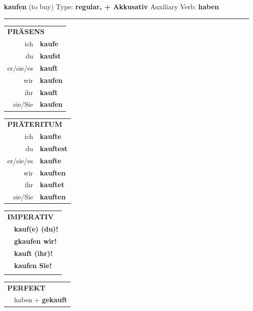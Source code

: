 \documentclass[10pt,a4paper]{revtex4-2}
\begin{document}
\begin{verbbox-acc}
    {\Large \bf kaufen} (to buy) \hfill Type: \textbf{regular, + Akkusativ} \hfill Auxiliary Verb: \textbf{haben} 
    
     \vspace{5pt}

    \hrule
    
    \vspace{5pt}

  \begin{tabular}{rl}
     \multicolumn{2}{l}{\textbf{PRÄSENS} }\\
    ich & \textbf{kaufe}\\
    du & \textbf{kaufst}\\
    er/sie/es & \textbf{kauft}\\
    wir & \textbf{kaufen}\\
    ihr & \textbf{kauft}\\
    sie/Sie & \textbf{kaufen}\\
  \end{tabular}
  \hfill
     \begin{tabular}{rl}
    \multicolumn{2}{l}{\textbf{PRÄTERITUM} }\\
    ich & \textbf{kaufte}\\
    du & \textbf{kauftest}\\
    er/sie/es & \textbf{kaufte}\\
    wir & \textbf{kauften}\\
    ihr & \textbf{kauftet}\\
    sie/Sie & \textbf{kauften}\\
  \end{tabular}
  \hfill
  \begin{tabular}{rl}
     \multicolumn{2}{l}{\textbf{IMPERATIV} }\\
   & \textbf{kauf(e) (du)!}\\
   & \textbf{gkaufen wir!}\\
   & \textbf{kauft (ihr)!}\\
   & \textbf{kaufen Sie!}\\
   & \vspace{10pt}
  \end{tabular}

    \vspace{10pt}

 \begin{tabular}{rl}
     \multicolumn{2}{l}{\textbf{PERFEKT}}\\
   & haben + \textbf{gekauft}\\
  \end{tabular}
\hfill
   \begin{tabular}{rl}
   

\end{tabular}
\end{verbbox-acc}
\end{document}

